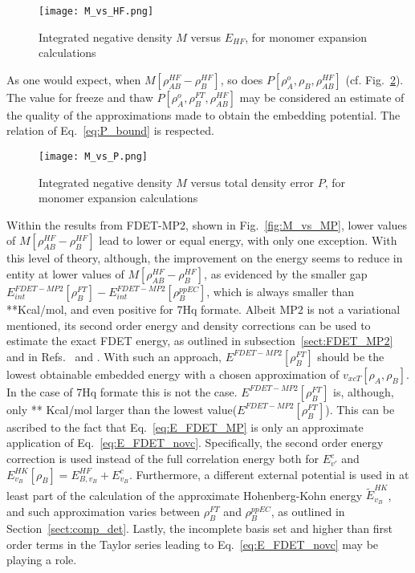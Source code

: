 \documentclass[journal=jctcce,manuscript=article, layout=twocolumn]{achemso}
\begin{document}
\begin{figure}[H]
\centering
\texttt{[image: M\_vs\_HF.png]}
\caption{Integrated negative density $M$ versus $E_{HF}$, for monomer expansion calculations}
\label{fig:M_VS_HF}
\end{figure}

As one would expect, when $M[\rho^{HF}_{AB} - \rho^{HF}_{B}]$, so does $P[\rho^{o}_A, \rho_B, \rho^{HF}_{AB}]$ (cf. Fig.~\ref{fig:M_vs_P}). The value for freeze and thaw $P[\rho^{o}_A, \rho_B^{FT}, \rho^{HF}_{AB}]$ may be considered an estimate of the quality of the approximations made to obtain the embedding potential. The relation of Eq.~\ref{eq:P_bound} is respected.

\begin{figure}[H]
\centering
\texttt{[image: M\_vs\_P.png]}
\caption{Integrated negative density $M$ versus total density error $P$, for monomer expansion calculations}
\label{fig:M_vs_P}
\end{figure}

Within the results from FDET-MP2, shown in Fig.~\ref{fig:M_vs_MP}, lower values of $M[\rho^{HF}_{AB} - \rho^{HF}_{B}]$ lead to lower or equal energy, with only one exception.
With this level of theory, although, the improvement on the energy seems to reduce in entity at lower values of $M[\rho^{HF}_{AB} - \rho^{HF}_{B}]$, as evidenced by the smaller gap $E^{FDET-MP2}_{int}[\rho_B^{FT}] - E^{FDET-MP2}_{int}[\rho_B^{ppEC}]$, which is always smaller than **Kcal/mol, and even positive for 7Hq formate.
Albeit MP2 is not a variational mentioned, its second order energy and density corrections can be used to estimate the exact FDET energy, as outlined in subsection~\ref{sect:FDET_MP2} and in Refs.~ and . With such an approach, $E^{FDET-MP2}[\rho_B^{FT}]$ should be the lowest obtainable embedded energy with a chosen approximation of $v_{xcT}[\rho_A,\rho_B]$. In the case of 7Hq formate this is not the case. $E^{FDET-MP2}[\rho_B^{FT}]$ is, although, only ** Kcal/mol larger than the lowest value($E^{FDET-MP2}[\rho_B^{FT}]$). This can be ascribed to the fact that Eq.~\ref{eq:E_FDET_MP} is only an approximate application of Eq.~\ref{eq:E_FDET_novc}. Specifically, the second order energy correction is used instead of the full correlation energy both for $E^c_{v'}$ and $E^{HK}_{v_B}[\rho_B] = E^{HF}_{B,v_B}+E^c_{v_B}$. Furthermore, a different external potential is used in at least part of the calculation of the approximate Hohenberg-Kohn energy $\tilde{E}^{HK}_{v_B}$, and such approximation varies between $\rho_B^{FT}$ and $\rho_B^{ppEC}$, as outlined in Section~\ref{sect:comp_det}. Lastly, the incomplete basis set and higher than first order terms in the Taylor series leading to Eq.~\ref{eq:E_FDET_novc} may be playing a role.
\end{document}
